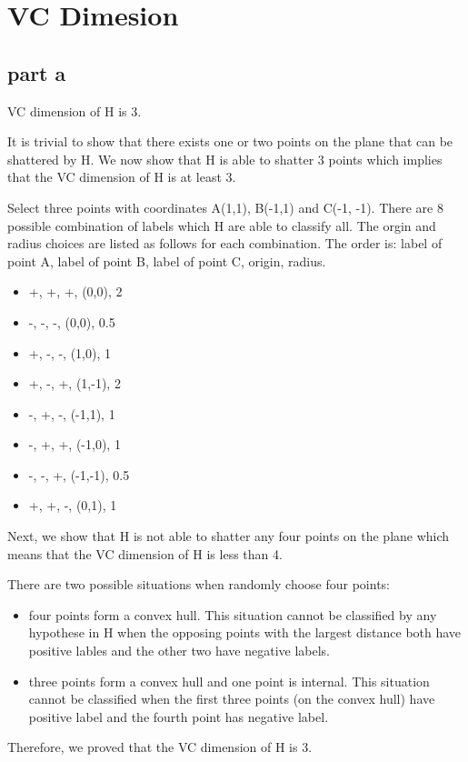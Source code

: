 \section{VC Dimesion}

\subsection{part a}
VC dimension of H is 3.

It is trivial to show that there exists one or two points on the plane that can be shattered by H. We now show that H is able to shatter 3 points which implies that the VC dimension of H is at least 3.

Select three points with coordinates A(1,1), B(-1,1) and C(-1, -1). There are 8 possible combination of labels which H are able to classify all. The orgin and radius choices are listed as follows for each combination. The order is: label of point A, label of point B, label of point C, origin, radius.
\begin{itemize}
\item +, +, +, (0,0), 2
\item -, -, -, (0,0), 0.5
\item +, -, -, (1,0), 1
\item +, -, +, (1,-1), 2
\item -, +, -, (-1,1), 1
\item -, +, +, (-1,0), 1
\item -, -, +, (-1,-1), 0.5
\item +, +, -, (0,1), 1
\end{itemize}

Next, we show that H is not able to shatter any four points on the plane which means that the VC dimension of H is less than 4.

There are two possible situations when randomly choose four points:
\begin{itemize}
\item four points form a convex hull. This situation cannot be classified by any hypothese in H when the opposing points with the largest distance both have positive lables and the other two have negative labels.
\item three points form a convex hull and one point is internal. This situation cannot be classified when the first three points (on the convex hull) have positive label and the fourth point has negative label.
\end{itemize}

Therefore, we proved that the VC dimension of H is 3.


